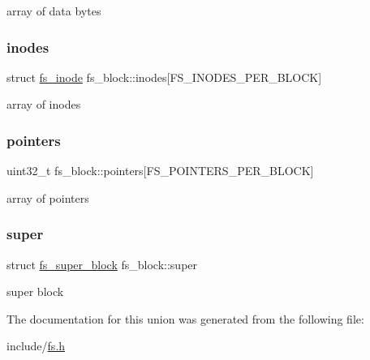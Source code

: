 array of data bytes \mbox{\label{unionfs__block_a43d96d75f7ec8b76e489d7772057b7af}} 
\subsubsection{\texorpdfstring{inodes}{inodes}}
{\footnotesize\ttfamily struct \mbox{\hyperlink{structfs__inode}{fs\+\_\+inode}} fs\+\_\+block\+::inodes\mbox{[}F\+S\+\_\+\+I\+N\+O\+D\+E\+S\+\_\+\+P\+E\+R\+\_\+\+B\+L\+O\+CK\mbox{]}}

array of inodes \mbox{\label{unionfs__block_a9f65c017631624e8fd41f9b994ec33db}} 
\subsubsection{\texorpdfstring{pointers}{pointers}}
{\footnotesize\ttfamily uint32\+\_\+t fs\+\_\+block\+::pointers\mbox{[}F\+S\+\_\+\+P\+O\+I\+N\+T\+E\+R\+S\+\_\+\+P\+E\+R\+\_\+\+B\+L\+O\+CK\mbox{]}}

array of pointers \mbox{\label{unionfs__block_a567fd97fc6dbdbede24dba13bbe9fef5}} 
\subsubsection{\texorpdfstring{super}{super}}
{\footnotesize\ttfamily struct \mbox{\hyperlink{structfs__super__block}{fs\+\_\+super\+\_\+block}} fs\+\_\+block\+::super}

super block 

The documentation for this union was generated from the following file\+:\begin{DoxyCompactItemize}
\item 
include/\mbox{\hyperlink{fs_8h}{fs.\+h}}\end{DoxyCompactItemize}
